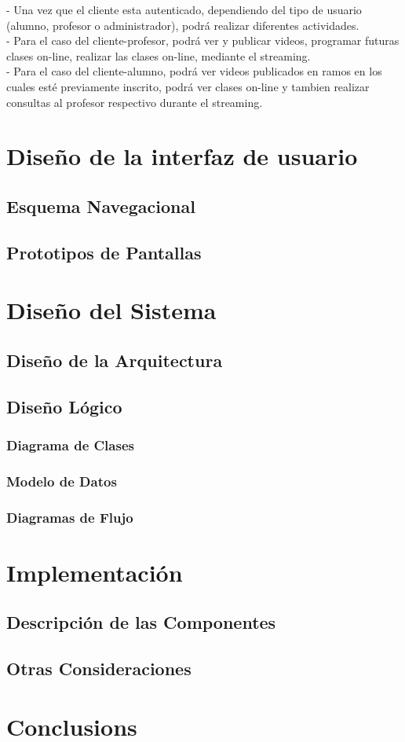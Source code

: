 \documentclass[12pt]{article}
\begin{document}
-	Una vez que el cliente esta autenticado, dependiendo del tipo de usuario (alumno, profesor o 
administrador), podrá realizar diferentes actividades.\\

-	Para el caso del cliente-profesor, podrá ver y publicar videos, programar futuras clases on-line, 
realizar las clases on-line, mediante el streaming.\\

-	Para el caso del cliente-alumno, podrá ver videos publicados en ramos en los cuales esté previamente
inscrito, podrá ver clases on-line y tambien realizar consultas al profesor respectivo durante el 
streaming.\\

\newpage
\section{Dise\~no de la interfaz de usuario}
\subsection{Esquema Navegacional}
\subsection{Prototipos de Pantallas}

\newpage
\section{Dise\~no del Sistema}
\subsection{Dise\~no de la Arquitectura}
\subsection{Dise\~no Lógico}
\subsubsection{Diagrama de Clases}
\subsubsection{Modelo de Datos}
\subsubsection{Diagramas de Flujo}

\newpage
\section{Implementación}
\subsection{Descripción de las Componentes}
\subsection{Otras Consideraciones}

\section{Conclusions}\label{conclusions}


\newpage

%
\end{document}
